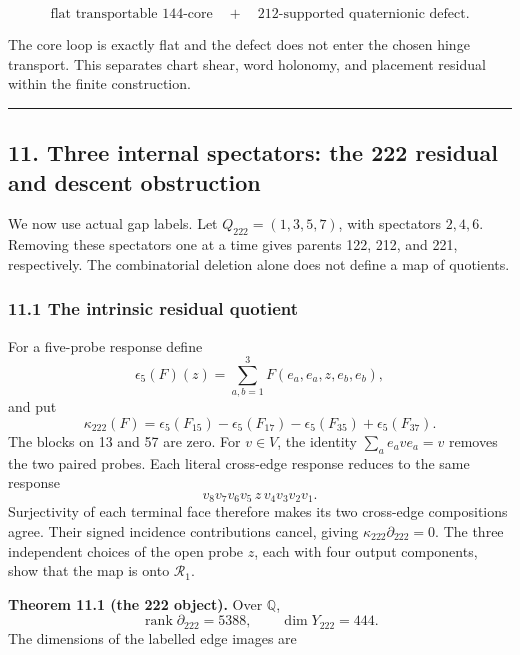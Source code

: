 \documentclass[
  11pt,
  a4paper,
]{article}
\begin{document}
\[
\boxed{
\text{flat transportable 144-core}
\quad+\quad
\text{\(212\)-supported quaternionic defect}.
}
\tag{10.7}
\]

The core loop is exactly flat and the defect does not enter the chosen
hinge transport. This separates chart shear, word holonomy, and
placement residual within the finite construction.

\begin{center}\rule{0.5\linewidth}{0.5pt}\end{center}

\hypertarget{three-internal-spectators-the-222-residual-and-descent-obstruction}{%
\subsection{11. Three internal spectators: the 222 residual and descent
obstruction}\label{three-internal-spectators-the-222-residual-and-descent-obstruction}}

We now use actual gap labels. Let \(Q_{222}=(1,3,5,7)\), with spectators
\(2,4,6\). Removing these spectators one at a time gives parents 122,
212, and 221, respectively. The combinatorial deletion alone does not
define a map of quotients.

\hypertarget{the-intrinsic-residual-quotient}{%
\subsubsection{11.1 The intrinsic residual
quotient}\label{the-intrinsic-residual-quotient}}

For a five-probe response define \[
 \epsilon_5(F)(z)=\sum_{a,b=1}^3F(e_a,e_a,z,e_b,e_b),
\] and put \[
 \kappa_{222}(F)=\epsilon_5(F_{15})-\epsilon_5(F_{17})
                 -\epsilon_5(F_{35})+\epsilon_5(F_{37}).
\] The blocks on 13 and 57 are zero. For \(v\in V\), the identity
\(\sum_a e_a v e_a=v\) removes the two paired probes. Each literal
cross-edge response reduces to the same response \[
 v_8v_7v_6v_5\,z\,v_4v_3v_2v_1.
\] Surjectivity of each terminal face therefore makes its two cross-edge
compositions agree. Their signed incidence contributions cancel, giving
\(\kappa_{222}\partial_{222}=0\). The three independent choices of the
open probe \(z\), each with four output components, show that the map is
onto \(\mathcal R_1\).

\textbf{Theorem 11.1 (the 222 object).} Over \(\mathbb Q\), \[
 \operatorname{rank}\partial_{222}=5388,\qquad\dim Y_{222}=444.
\] The dimensions of the labelled edge images are
\end{document}
